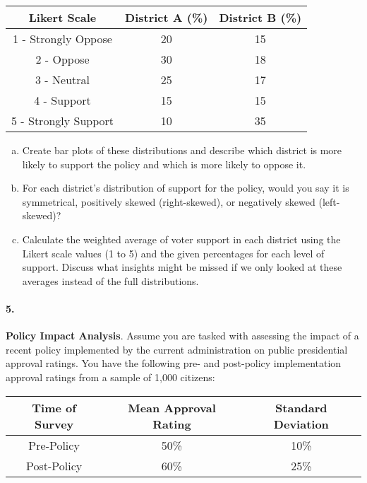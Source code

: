 \documentclass{article}
\begin{document}
\begin{center}
\begin{tabular}{|c|c|c|}
\hline Likert Scale & District A (\%) & District B (\%) \\
\hline
1 - Strongly Oppose & 20 & 15 \\
2 - Oppose & 30 & 18 \\
3 - Neutral & 25 & 17 \\
4 - Support & 15 & 15 \\
5 - Strongly Support & 10 & 35 \\
\hline
\end{tabular}
\end{center}

\begin{enumerate}[a)]
    \item Create bar plots of these distributions and describe which district is more likely to support the policy and which is more likely to oppose it.
    \item For each district's distribution of support for the policy, would you say it is symmetrical, positively skewed (right-skewed), or negatively skewed (left-skewed)?
    \item Calculate the weighted average of voter support in each district using the Likert scale values (1 to 5) and the given percentages for each level of support. Discuss what insights might be missed if we only looked at these averages instead of the full distributions.
\end{enumerate}


\paragraph{5.} \textbf{Policy Impact Analysis}.
Assume you are tasked with assessing the impact of a recent policy implemented by the current administration on public presidential approval ratings. You have the following pre- and post-policy implementation approval ratings from a sample of 1,000 citizens:
\begin{center}
    \begin{tabular}{|c|c|c|}
    \hline
    Time of Survey & Mean Approval Rating & Standard Deviation \\
    \hline
    Pre-Policy & 50\% & 10\% \\
    Post-Policy & 60\% & 25\% \\
    \hline
    \end{tabular}
\end{center}
\end{document}
